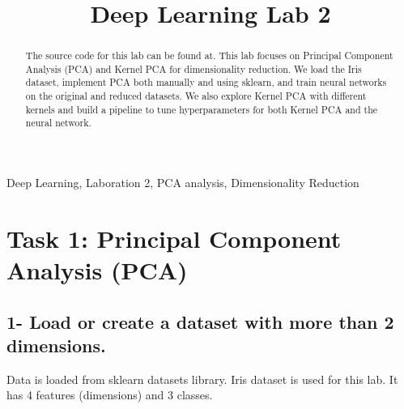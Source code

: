 \documentclass[conference]{IEEEtran}
\begin{document}
\title{Deep Learning Lab 2 \\
}

\author{
\and
{}
\and
{}
}

\maketitle

\thispagestyle{plain}
\pagestyle{plain}


\begin{IEEEkeywords}
Deep Learning, Laboration 2, PCA analysis, Dimensionality Reduction
\end{IEEEkeywords}
\begin{abstract}
    The source code for this lab can be found at\cite{dataset}. This lab focuses on Principal Component Analysis (PCA) and Kernel PCA for dimensionality reduction. We load the Iris dataset, implement PCA both manually and using sklearn, and train neural networks on the original and reduced datasets. We also explore Kernel PCA with different kernels and build a pipeline to tune hyperparameters for both Kernel PCA and the neural network.
    
\end{abstract}

\section{Task 1: Principal Component Analysis (PCA)}
\subsection{1- Load or create a dataset with more than 2 dimensions.}
Data is loaded from sklearn datasets library. Iris dataset is used for this lab. It has 4 features (dimensions) and 3 classes.
\end{document}
